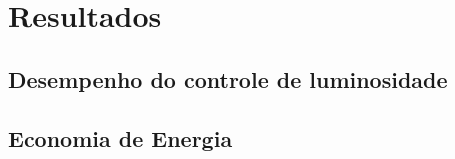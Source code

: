 \chapter{Resultados}

\section{Desempenho do controle de luminosidade}

\section{Economia de Energia}